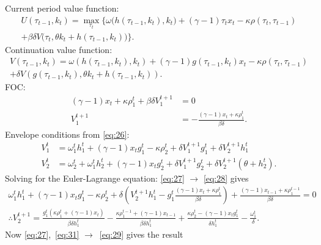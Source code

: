 \documentclass{amsart}
\begin{document}
Current period value function:
\begin{multline}
  \label{eq:25} U(\tau_{t-1},k_t) = \max_{\tau_t} \bigg\{ \omega\big(
h(\tau_{t-1},k_t),k_t\big) + (\gamma -1)\tau_tx_t - \kappa \rho(\tau_t,\tau_{t-1}) \\ + \beta\delta V \big(
\tau_t, \theta k_t + h(\tau_{t-1},k_t)\big) \bigg\}.
\end{multline} Continuation value function:
\begin{multline}
  \label{eq:26} V(\tau_{t-1},k_t) = \omega\left(
h(\tau_{t-1},k_t),k_t\right)  + (\gamma -1)g(\tau_{t-1},k_t)x_t
- \kappa \rho(\tau_t,\tau_{t-1}) \\+
\delta V \left( g(\tau_{t-1},k_t), \theta k_t +
h(\tau_{t-1},k_t)\right).
\end{multline} FOC:
\begin{align}
  (\gamma-1)x_t + \kappa\rho^t_1 + \beta\delta V^{t+1}_1 &= 0 \\ \label{eq:27}
  V^{t+1}_1 &= -\frac{(\gamma-1)x_t + \kappa\rho^t_1}{\beta\delta}.
\end{align} Envelope conditions from \eqref{eq:26}:
\begin{align}
  \label{eq:28} V^t_1 &= \omega^t_1h^t_1 + (\gamma-1)x_tg^t_1 - \kappa\rho^t_2 + \delta
V^{t+1}_1g^t_1 + \delta V^{t+1}_2h^t_1 \\ \label{eq:29} V^t_2 &= \omega^t_2 +
\omega^t_1h^t_2 + (\gamma-1)x_tg^t_2 + \delta V^{t+1}_1g^t_2 + \delta
V^{t+1}_2 (\theta + h^t_2).
\end{align} Solving for the Euler-Lagrange equation: \eqref{eq:27}
$\rightarrow$ \eqref{eq:28} gives
\begin{gather}
  \label{eq:30} \omega^t_1h^t_1 + (\gamma-1)x_tg^t_1 -\kappa\rho^t_2 +
  \delta \left(
    V^{t+1}_2h^t_1 - g^t_1\frac{(\gamma-1)x_t + \kappa\rho^t_1}{\beta\delta} \right) + \frac{(\gamma-1)x_{t-1} + \kappa\rho^{t-1}_1}{\beta\delta} = 0 \\
  \label{eq:31} \therefore V^{t+1}_2 = \frac{g^t_1 ( \kappa \rho^t_1
    + (\gamma-1)x_t)}{\beta\delta h^t_1} - \frac{\kappa\rho^{t-1}_1 +
    (\gamma-1)x_{t-1}}{\beta\delta h^t_1} + \frac{\kappa\rho^t_2 -
    (\gamma-1)x_tg^t_1}{\delta h^t_1} - \frac{\omega^t_1}{\delta}.
\end{gather} Now \eqref{eq:27},~\eqref{eq:31}
$\rightarrow$~\eqref{eq:29} gives the result
\end{document}
